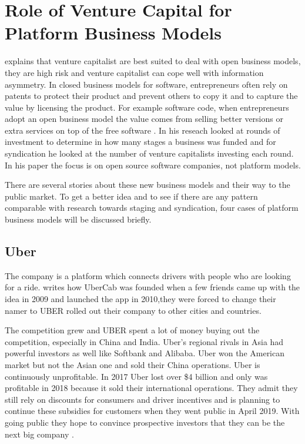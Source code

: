 \documentclass[a4paper, 11pt]{article}
\begin{document}
\section{Role of Venture Capital for Platform Business Models}

\cite{colombo2016open} explains that venture capitalist are best suited to deal with open business models, they are high risk and venture capitalist can cope well with information asymmetry. In closed business models for software, entrepreneurs often rely on patents to protect their product and prevent others to copy it and to capture the value by licensing the product. For example software code, when entrepreneurs adopt an open business model the value comes from selling better versions or extra services on top of the free software \citep{colombo2016open}. In his reseach \cite{colombo2016open} looked at rounds of investment to determine in how many stages a business was funded and for syndication he looked at the number of venture capitalists investing each round. In his paper the focus is on open source software companies, not platform models.


There are several stories about these new business models and their way to the public market. To get a better idea and to see if there are any pattern comparable with \cite{colombo2016open} research towards staging and syndication, four cases of platform business models will be discussed briefly.


\subsection{Uber}

The company is a platform which connects drivers with people who are looking for a ride. \cite{griswold} writes how UberCab was founded when a few friends came up with the idea in 2009 and launched the app in 2010,they were forced to change their namer to UBER rolled out their company to other cities and countries.

The competition grew and UBER spent a lot of money buying out the competition, especially in China and India. Uber’s regional rivals in Asia had powerful investors as well like Softbank and Alibaba. Uber won the American market but not the Asian one and sold their China operations. Uber is continuously unprofitable. In 2017 Uber lost over \$4 billion and only was profitable in 2018 because it sold their international operations. They admit they still rely on discounts for consumers and driver incentives and is planning to continue these subsidies for customers when they went public in April 2019. With going public they hope to convince prospective investors that they can be the next big company \cite{griswold}.
\end{document}
